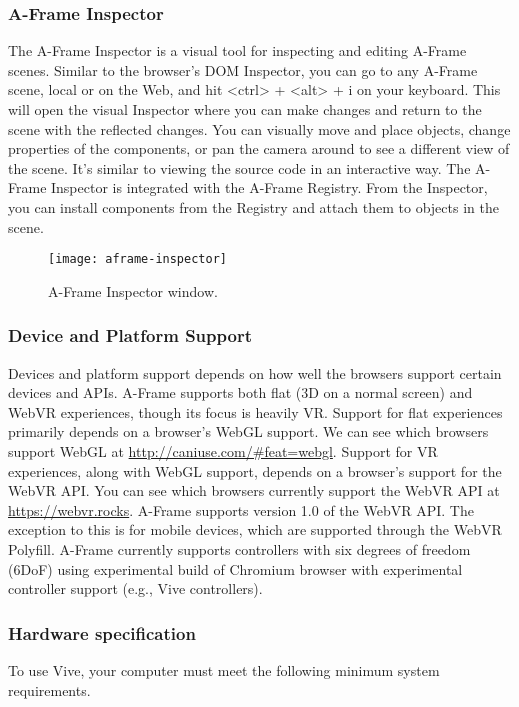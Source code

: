 \subsubsection{A-Frame Inspector}
The A-Frame Inspector is a visual tool for inspecting and editing A-Frame scenes. Similar to the browser’s DOM Inspector, you can go to any A-Frame scene, local or on the Web, and hit <ctrl> + <alt> + i on your keyboard. This will open the visual Inspector where you can make changes and return to the scene with the reflected changes. You can visually move and place objects, change properties of the components, or pan the camera around to see a different view of the scene. It’s similar to viewing the source code in an interactive way. The A-Frame Inspector is integrated with the A-Frame Registry. From the Inspector, you can install components from the Registry and attach them to objects in the scene. \cite{aframe-intro}

\begin{figure}[ht!]
\centering
\texttt{[image: aframe-inspector]}
\caption{A-Frame Inspector window.}
\label{r:41}
\end{figure}

\subsubsection{Device and Platform Support}
Devices and platform support depends on how well the browsers support certain devices and APIs. A-Frame supports both flat (3D on a normal screen) and WebVR experiences, though its focus is heavily VR. Support for flat experiences primarily depends on a browser’s WebGL support. We can see which browsers support WebGL at \url{http://caniuse.com/#feat=webgl}. Support for VR experiences, along with WebGL support, depends on a browser’s support for the WebVR API. You can see which browsers currently support the WebVR API at \url{https://webvr.rocks}. A-Frame supports version 1.0 of the WebVR API. The exception to this is for mobile devices, which are supported through the WebVR Polyfill. A-Frame currently supports controllers with six degrees of freedom (6DoF) using experimental build of Chromium browser with experimental controller support (e.g., Vive controllers). \cite{aframe-intro}

\subsubsection{Hardware specification}
To use Vive, your computer must meet the following minimum system requirements.

